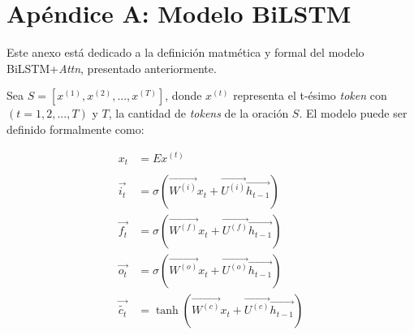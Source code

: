 \appendix
\chapter{Apéndice A: Modelo BiLSTM}\label{anex_1}

Este anexo está dedicado a la definición matmética y formal del modelo BiLSTM+\textit{Attn}, presentado anteriormente.

Sea $S = [x^{(1)}, x^{(2)}, ..., x^{(T)}]$, donde $x^{(t)}$ representa el t-ésimo \textit{token} con $(t = 1, 2, ..., T)$ y $T$, la cantidad de \textit{tokens} de la oración $S$. El modelo puede ser definido formalmente como:

\begin{align}
  x_{t} &= Ex^{(t)} \label{bilstm:emb}\\
  \nonumber \\
  \overrightarrow{i_{t}} &= \sigma{(\overrightarrow{W^{(i)}} x_{t} + \overrightarrow{U^{(i)}}\overrightarrow{h_{t-1}})} \label{bilstm:ig} \\
  \overrightarrow{f_{t}} &= \sigma{(\overrightarrow{W^{(f)}} x_{t} + \overrightarrow{U^{(f)}}\overrightarrow{h_{t-1}})} \label{bilstm:fg} \\
  \overrightarrow{o_{t}} &= \sigma{(\overrightarrow{W^{(o)}} x_{t} + \overrightarrow{U^{(o)}}\overrightarrow{h_{t-1}})} \label{bilstm:og} \\
  \overrightarrow{\tilde{c_{t}}} &= \tanh(\overrightarrow{W^{(c)}} x_{t} + \overrightarrow{U^{(c)}}\overrightarrow{h_{t-1}}) \label{bilstm:new_memory_cell}
\end{align}

